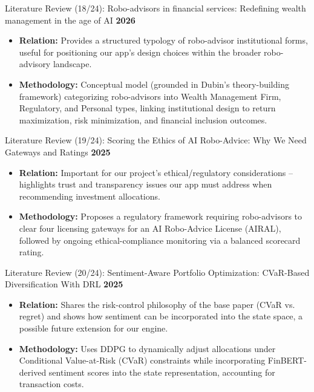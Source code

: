 \documentclass{beamer}
\begin{document}
\begin{frame}{Literature Review (18/24): Robo-advisors in financial services: Redefining wealth management in the age of AI}
\small
\textbf{2026}
\begin{itemize}
    \item \textbf{Relation:} Provides a structured typology of robo-advisor institutional forms, useful for positioning our app's design choices within the broader robo-advisory landscape.
    \item \textbf{Methodology:} Conceptual model (grounded in Dubin's theory-building framework) categorizing robo-advisors into Wealth Management Firm, Regulatory, and Personal types, linking institutional design to return maximization, risk minimization, and financial inclusion outcomes.
\end{itemize}
\end{frame}

\begin{frame}{Literature Review (19/24): Scoring the Ethics of AI Robo-Advice: Why We Need Gateways and Ratings}
\small
\textbf{2025}
\begin{itemize}
    \item \textbf{Relation:} Important for our project's ethical/regulatory considerations -- highlights trust and transparency issues our app must address when recommending investment allocations.
    \item \textbf{Methodology:} Proposes a regulatory framework requiring robo-advisors to clear four licensing gateways for an AI Robo-Advice License (AIRAL), followed by ongoing ethical-compliance monitoring via a balanced scorecard rating.
\end{itemize}
\end{frame}

\begin{frame}{Literature Review (20/24): Sentiment-Aware Portfolio Optimization: CVaR-Based Diversification With DRL}
\small
\textbf{2025}
\begin{itemize}
    \item \textbf{Relation:} Shares the risk-control philosophy of the base paper (CVaR vs. regret) and shows how sentiment can be incorporated into the state space, a possible future extension for our engine.
    \item \textbf{Methodology:} Uses DDPG to dynamically adjust allocations under Conditional Value-at-Risk (CVaR) constraints while incorporating FinBERT-derived sentiment scores into the state representation, accounting for transaction costs.
\end{itemize}
\end{frame}
\end{document}
